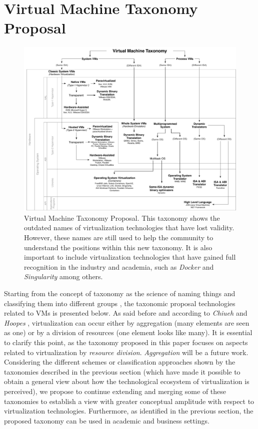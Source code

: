 	\section {Virtual Machine Taxonomy Proposal} \label{sec:taxonomiaPropuesta}
	
	\begin{figure}[ht]
		\centering
		\includegraphics[width=17cm]{images/virtualMachineTaxonomy.pdf}
		\vspace{-0.2cm}%
		\caption{Virtual Machine Taxonomy Proposal. This taxonomy shows the outdated names of virtualization technologies that have lost validity. However, these names are still used to help the community to understand the positions within this new taxonomy. It is also important to include virtualization technologies that have gained full recognition in the industry and academia, such as \textit{Docker} and \textit{Singularity} among others. }
    	\label{fig:TaxonomiaPropuesta}
	\end{figure}
	
	Starting from the concept of taxonomy as the science of naming things and classifying them into different groups \cite{CambridgeDictionary2018, Chi2000}, the taxonomic proposal technologies related to VMs is presented below. As said before and according to \textit{Chiueh} \cite{Chiueh2005} and \textit{Hoopes} \cite{Hoopes2009}, virtualization can occur either by aggregation (many elements are seen as one) or by a division of resources (one element looks like many). It is essential to clarify this point, as the taxonomy proposed in this paper focuses on aspects related to virtualization by \textit{resource division}. \textit{Aggregation} will be a future work. Considering the different schemes or classification approaches shown by the taxonomies described in the previous section (which have made it possible to obtain a general view about how the technological ecosystem of virtualization is perceived), we propose to continue extending and merging some of these taxonomies to establish a view with greater conceptual amplitude with respect to virtualization technologies. Furthermore, as identified in the previous section, the proposed taxonomy can be used in academic and business settings.
	
